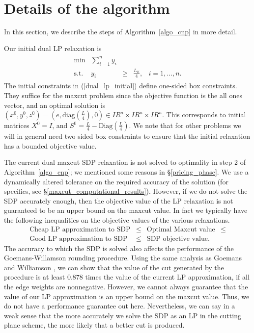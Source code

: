 \documentclass[12pt]{article}
\newcommand{\real}{I\!\!R}
\begin{document}
\section{Details of the algorithm   \label{sec_details}}
In this section, we describe the steps of Algorithm~\ref{algo_cnp} in more detail.

Our initial dual LP relaxation is
\begin{eqnarray}
\label{dual_lp_initial}
\begin{array}{lrccc}
\min & \displaystyle \sum_{i=1}^n y_i  \\
\mbox{s.t.} & y_i & \ge & \frac{L_{ii}}{4}, & i=1,\ldots,n.
\end{array}
\end{eqnarray}
The initial constraints in (\ref{dual_lp_initial}) define
one-sided box constraints. They suffice for the maxcut problem
since the objective function is the all ones vector, and an
optimal solution is $(x^0,y^0,z^0) =
(e,\mbox{diag}(\frac{L}{4}),0) \in \real^n \times \real^n \times
\real^n$. This corresponds to initial matrices $X^0 = I$, and $S^0
= \frac{L}{4} - \mbox{Diag}(\frac{L}{4})$. We note that for other
problems we will in general need two sided box constraints to
ensure that the initial relaxation has a bounded objective value.

The current dual maxcut SDP relaxation is not solved to optimality
in step 2 of Algorithm~\ref{algo_cnp}; we mentioned some reasons in \S\ref{pricing_phase}. We
use a dynamically altered tolerance on the required accuracy of
the solution (for specifics, see
\S\ref{maxcut_computational_results}). However, if we do not solve
the SDP accurately enough, then the objective value of the LP
relaxation is not guaranteed to be an upper bound on the maxcut
value. In fact we typically have the following inequalities on the
objective values of the various relaxations.
\begin{displaymath}
\begin{array}{cccc}
\mbox{Cheap LP approximation to SDP} & \le & \mbox{Optimal Maxcut value} & \le \\
\mbox{Good LP approximation to SDP} & \le & \mbox{SDP objective
value}.
\end{array}
\end{displaymath}
The accuracy to which the SDP is solved also affects the
performance of the Goemans-Willamson rounding procedure. Using the
same analysis as Goemans and Williamson \cite{goemans1}, we can
show that the value of the cut generated by the procedure is at
least $0.878$ times the value of the current LP approximation, if
all the edge weights are nonnegative. However, we cannot always
guarantee that the value of our LP approximation is an upper bound
on the maxcut value. Thus, we do not have a performance guarantee
out here. Nevertheless, we can say in a weak sense that the more
accurately we solve the SDP as an LP in the cutting plane scheme,
the more likely that a better cut is produced.
\end{document}
